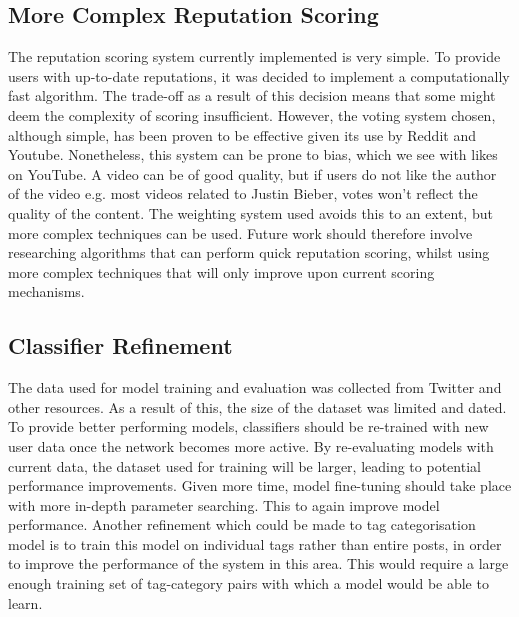\subsection{More Complex Reputation Scoring}
The reputation scoring system currently implemented is very simple. To provide users with up-to-date reputations, it was decided to implement a computationally fast algorithm. The trade-off as a result of this decision means that some might deem the complexity of scoring insufficient. However, the voting system chosen, although simple, has been proven to be effective given its use by Reddit and Youtube. Nonetheless, this system can be prone to bias, which we see with likes on YouTube. A video can be of good quality, but if users do not like the author of the video e.g. most videos related to Justin Bieber, votes won't reflect the quality of the content. The weighting system used avoids this to an extent, but more complex techniques can be used. Future work should therefore involve researching algorithms that can perform quick reputation scoring, whilst using more complex techniques that will only improve upon current scoring mechanisms.

\subsection{Classifier Refinement}
The data used for model training and evaluation was collected from Twitter and other resources. As a result of this, the size of the dataset was limited and dated. To provide better performing models, classifiers should be re-trained with new user data once the network becomes more active. By re-evaluating models with current data, the dataset used for training will be larger, leading to potential performance improvements. Given more time, model fine-tuning should take place with more in-depth parameter searching. This to again improve model performance. Another refinement which could be made to tag categorisation model is to train this model on individual tags rather than entire posts, in order to improve the performance of the system in this area. This would require a large enough training set of tag-category pairs with which a model would be able to learn.

